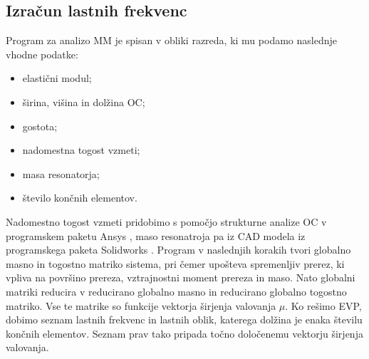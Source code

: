 \documentclass[12pt]{report}
\begin{document}
\subsection{Izračun lastnih frekvenc}
Program za analizo \ac{MM} je spisan v obliki razreda, ki mu podamo naslednje vhodne podatke:
\begin{itemize}
  \item elastični modul;
  \item širina, višina in dolžina \ac{OC};
  \item gostota;
  \item nadomestna togost vzmeti;
  \item masa resonatorja;
  \item število končnih elementov.
\end{itemize}
Nadomestno togost vzmeti pridobimo s pomočjo strukturne analize \ac{OC} v programskem paketu Ansys \cite{ansys}, maso resonatroja pa iz CAD modela iz programskega paketa Solidworks \cite{solidworks}. Program v naslednjih korakih tvori globalno masno in togostno matriko
sistema, pri čemer upošteva spremenljiv prerez, ki vpliva na površino prereza, vztrajnostni moment prereza in maso. Nato globalni matriki reducira v reducirano globalno masno in reducirano globalno
togostno matriko. Vse te matrike so funkcije vektorja širjenja valovanja $\mu$. Ko rešimo \ac{EVP}, dobimo seznam lastnih frekvenc in lastnih oblik, katerega dolžina je enaka številu končnih elementov. Seznam prav tako pripada točno določenemu vektorju širjenja valovanja.
\end{document}
